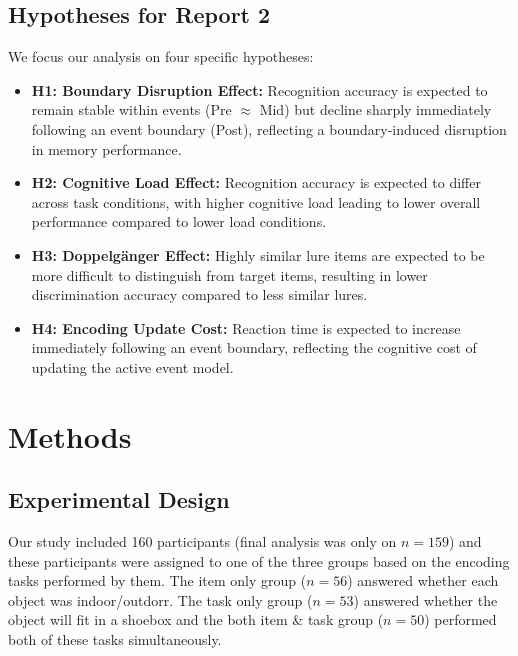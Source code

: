 \documentclass[
  12pt,
]{article}
\providecommand{\tightlist}{%
  \setlength{\itemsep}{0pt}\setlength{\parskip}{0pt}}
\begin{document}
\subsection{Hypotheses for Report 2}\label{Hypotheses-for-Report-2}

We focus our analysis on four specific hypotheses:

\begin{itemize}
\tightlist
\item
\textbf{H1: Boundary Disruption Effect:} Recognition accuracy is expected to remain stable within events (Pre $\approx$ Mid) but decline sharply immediately following an event boundary (Post), reflecting a boundary-induced disruption in memory performance.

\item
\textbf{H2: Cognitive Load Effect:} Recognition accuracy is expected to differ across task conditions, with higher cognitive load leading to lower overall performance compared to lower load conditions.

\item
\textbf{H3: Doppelgänger Effect:} Highly similar lure items are expected to be more difficult to distinguish from target items, resulting in lower discrimination accuracy compared to less similar lures.

\item
\textbf{H4: Encoding Update Cost:} Reaction time is expected to increase immediately following an event boundary, reflecting the cognitive cost of updating the active event model.
\end{itemize}

\section{Methods}

\subsection{Experimental Design}

Our study included 160 participants (final analysis was only on $n = 159$) and these participants were assigned to one of the three groups based on the encoding tasks performed by them. The item only group ($n = 56$) answered whether each object was indoor/outdorr. The task only group ($n = 53$) answered whether the object will fit in a shoebox and the both item \& task group ($n = 50$) performed both of these tasks simultaneously.
\end{document}
